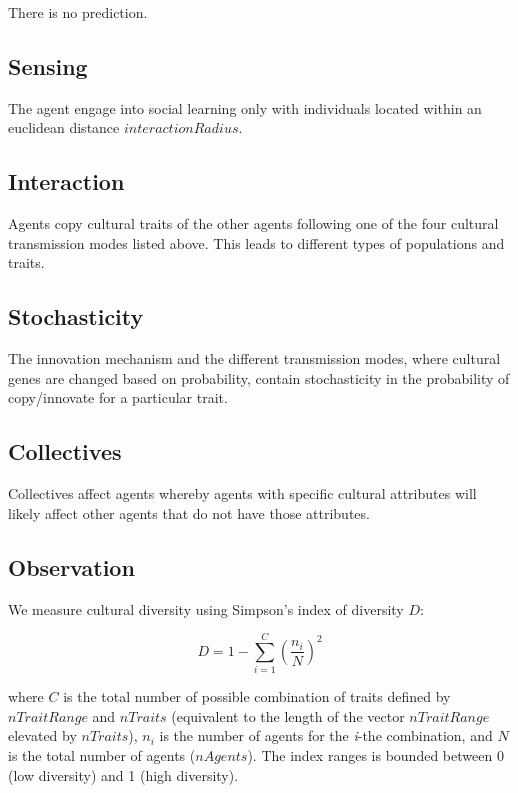 \documentclass[11pt,a4paper,twocolumn,notitlepage]{article}
\begin{document}
There is no prediction.

\subsection{Sensing}

The agent engage into social learning only with individuals located within an euclidean distance $interactionRadius$.

\subsection{Interaction}

Agents copy cultural traits of the other agents following one of the four cultural transmission modes listed above. This leads to different types of populations and traits. 

\subsection{Stochasticity}

The innovation mechanism and the different transmission modes, where cultural genes are changed based on probability, contain stochasticity in the probability of copy/innovate for a particular trait. 

\subsection{Collectives}

Collectives affect agents whereby agents with specific cultural attributes will likely affect other agents that do not have those attributes. %

\subsection{Observation}

We measure cultural diversity using Simpson's index of diversity $D$:

\begin{equation}
D = 1 - \sum\limits_{i=1}^C{\left(\frac{n_i}{N}\right)^2}
\end{equation}

where $C$ is the total number of possible combination of traits defined by $nTraitRange$ and $nTraits$ (equivalent to the length of the vector $nTraitRange$ elevated by $nTraits$), $n_i$ is the number of agents for the \emph{i}-the combination, and $N$ is the total number of agents ($nAgents$). The index ranges is bounded between 0 (low diversity) and 1 (high diversity). 
\end{document}
